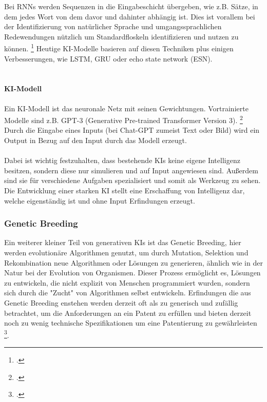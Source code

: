 Bei RNNs werden Sequenzen in die Eingabeschicht übergeben, 
wie z.B. Sätze, 
in dem jedes Wort von dem davor und dahinter abhängig ist. 
Dies ist vorallem bei der Identifizierung von natürlicher Sprache 
und umgangssprachlichen Redewendungen nützlich um  
Standardfloskeln identifizieren und nutzen zu können.
\footcite{WasSindRekurrente2023}
Heutige KI-Modelle basieren auf diesen Techniken plus einigen Verbesserungen,
wie \gls{LSTM}, \gls{GRU} 
oder echo state network (ESN).
\\
\\
\paragraph{KI-Modell}
Ein KI-Modell ist das neuronale Netz mit seinen Gewichtungen. 
Vortrainierte Modelle sind z.B. GPT-3 (Generative Pre-trained Transformer Version 3).
\footcite{KuenstlicheIntelligenzKI}
Durch die Eingabe eines Inputs (bei Chat-GPT zumeist Text oder Bild) 
wird ein Output in Bezug auf den Input durch das Modell erzeugt.
\\
\\
Dabei ist wichtig festzuhalten, dass bestehende KIs keine 
eigene Intelligenz besitzen, sondern diese nur simulieren 
und auf Input angewiesen sind. Außerdem sind sie für 
verschiedene Aufgaben spezialisiert und somit als Werkzeug zu sehen. 
Die Entwicklung einer starken KI stellt eine Erschaffung von Intelligenz dar,
welche eigenständig ist und ohne Input Erfindungen erzeugt.

\subsubsection{Genetic Breeding}
Ein weiterer kleiner Teil von generativen KIs ist das Genetic Breeding, 
hier werden evolutionäre Algorithmen genutzt, 
um durch Mutation, Selektion und Rekombination 
neue Algorithmen oder Lösungen zu generieren, 
ähnlich wie in der Natur bei der Evolution von Organismen.
Dieser Prozess ermöglicht es, Lösungen zu entwickeln, 
die nicht explizit von Menschen programmiert wurden, 
sondern sich durch die "Zucht" von Algorithmen 
selbst entwickeln.
Erfindungen die aus Genetic Breeding enstehen werden derzeit
oft als zu generisch und zufällig betrachtet, 
um die Anforderungen an ein Patent zu erfüllen und bieten
derzeit noch zu wenig technische Spezifikationen 
um eine Patentierung zu gewährleisten 
\footcite{hartmannKuenstlicheIntelligenzIm2020}.

\newpage

